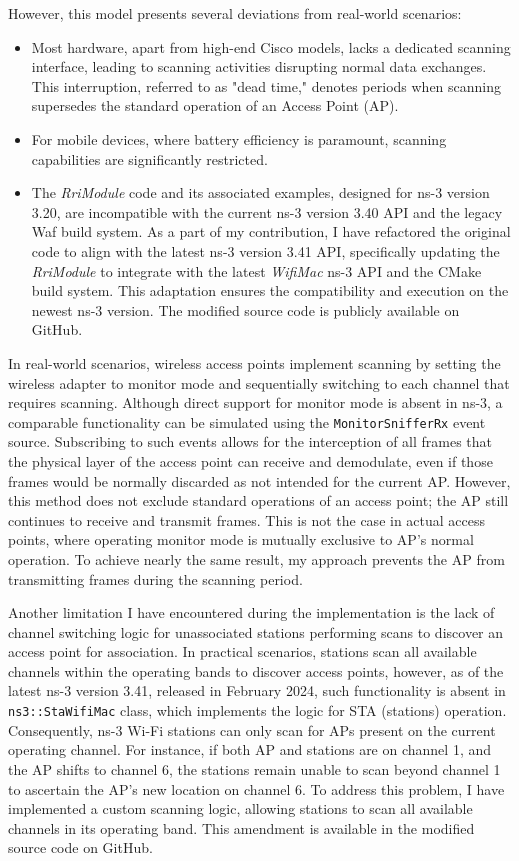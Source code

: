 However, this model presents several deviations from real-world scenarios:
\begin{itemize}
    \item Most hardware, apart from high-end Cisco models, lacks a dedicated scanning interface, leading to scanning activities disrupting normal data exchanges. This interruption, referred to as "dead time," denotes periods when scanning supersedes the standard operation of an Access Point (AP).
    \item For mobile devices, where battery efficiency is paramount, scanning capabilities are significantly restricted.
    \item The \textit{RriModule} code and its associated examples, designed for ns-3 version 3.20, are incompatible with the current ns-3 version 3.40 API and the legacy Waf build system. As a part of my contribution, I have refactored the original code to align with the latest ns-3 version 3.41 API, specifically updating the \textit{RriModule} to integrate with the latest \textit{WifiMac} ns-3 API and the CMake build system. This adaptation ensures the compatibility and execution on the newest ns-3 version. The modified source code is publicly available on GitHub.
\end{itemize}

In real-world scenarios, wireless access points implement scanning by setting the wireless adapter to monitor mode and sequentially switching to each channel that requires scanning. Although direct support for monitor mode is absent in ns-3, a comparable functionality can be simulated using the \texttt{MonitorSnifferRx} event source. Subscribing to such events allows for the interception of all frames that the physical layer of the access point can receive and demodulate, even if those frames would be normally discarded as not intended for the current AP. However, this method does not exclude standard operations of an access point; the AP still continues to receive and transmit frames. This is not the case in actual access points, where operating monitor mode is mutually exclusive to AP's normal operation. To achieve nearly the same result, my approach prevents the AP from transmitting frames during the scanning period.

Another limitation I have encountered during the implementation is the lack of channel switching logic for unassociated stations performing scans to discover an access point for association. In practical scenarios, stations scan all available channels within the operating bands to discover access points, however, as of the latest ns-3 version 3.41, released in February 2024, such functionality is absent in \texttt{ns3::StaWifiMac} class, which implements the logic for STA (stations) operation. Consequently, ns-3 Wi-Fi stations can only scan for APs present on the current operating channel. For instance, if both AP and stations are on channel 1, and the AP shifts to channel 6, the stations remain unable to scan beyond channel 1 to ascertain the AP's new location on channel 6. To address this problem, I have implemented a custom scanning logic, allowing stations to scan all available channels in its operating band. This amendment is available in the modified source code on GitHub.


